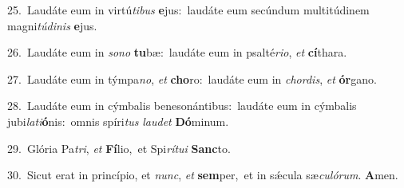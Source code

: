 {\numbfont\textcolor{\numbcolor}{25.}}~Laudáte eum in virtú\-\textit{ti}\-\textit{bus} \textbf{e}\-jus:~\star laudáte eum secúndum multitúdinem magni\-\textit{tú}\-\textit{di}\textit{nis} \textbf{e}\-jus.\par
{\numbfont\textcolor{\numbcolor}{26.}}~Laudáte eum in \textit{so}\-\textit{no} \textbf{tu}\-bæ:~\star laudáte eum in psalté\-\textit{ri}\-\textit{o}, \textit{et} \textbf{cí}\-thara.\par
{\numbfont\textcolor{\numbcolor}{27.}}~Laudáte eum in týmpa\-\textit{no}\-, \textit{et} \textbf{cho}\-ro:~\star laudáte eum in \textit{chor}\-\textit{dis}, \textit{et} \textbf{ór}\-gano.\par
{\numbfont\textcolor{\numbcolor}{28.}}~Laudáte eum in cýmbalis benesonántibus:~\dagger laudáte eum in cýmbalis jubi\-\textit{la}\-\textit{ti}\textbf{ó}nis:~\star omnis spíri\textit{tus} \textit{lau}\-\textit{det} \textbf{Dó}\-minum.\par
{\numbfont\textcolor{\numbcolor}{29.}}~Glória Pa\-\textit{tri}\-, \textit{et} \textbf{Fí}\-lio,~\star et Spi\-\textit{rí}\-\textit{tu}\textit{i} \textbf{Sanc}\-to.\par
{\numbfont\textcolor{\numbcolor}{30.}}~Sicut erat in princípio, et \textit{nunc}\-, \textit{et} \textbf{sem}\-per,~\star et in sǽcula sæ\-\textit{cu}\-\textit{ló}\textit{rum}. \textbf{A}\-men.\par
